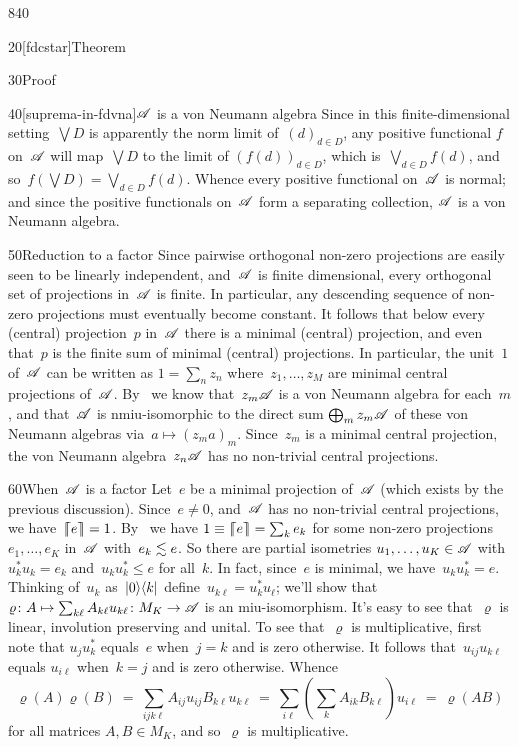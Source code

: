 \begin{parsec}{840}
\begin{point}{20}[fdcstar]{Theorem}
\begin{point}{30}{Proof}
\begin{point}{40}[suprema-in-fdvna]{$\mathscr{A}$ is a von Neumann algebra}
Since in this finite-dimensional setting~$\bigvee D$
is apparently the norm limit of~$(d)_{d\in D}$,
any positive functional $f$ on~$\mathscr{A}$
will map~$\bigvee D$ to the limit of
$(f(d))_{d\in D}$,
which is~$\bigvee_{d\in D} f(d)$,
and so~$f(\bigvee D)=\bigvee_{d\in D} f(d)$.
Whence every positive functional on~$\mathscr{A}$
is normal; and since the positive functionals on~$\mathscr{A}$
form a separating collection,
$\mathscr{A}$ is a von Neumann algebra.
\end{point}
\begin{point}{50}{Reduction to a factor}%
Since pairwise orthogonal non-zero projections
are easily seen to be linearly independent,
and~$\mathscr{A}$ is finite dimensional,
every orthogonal set of projections in~$\mathscr{A}$ is finite.
In particular,
any descending sequence of non-zero projections must eventually become
constant.
It follows that below every (central) projection~$p$ in~$\mathscr{A}$
there is a minimal (central) projection,
and even that~$p$ is the finite sum of minimal (central) projections.
In particular,
the unit~$1$ of~$\mathscr{A}$ can be written
as $1=\sum_n z_n$ where~$z_1,\dotsc,z_M$ are minimal central projections
of~$\mathscr{A}$.
By~
we know that~$z_m\mathscr{A}$ is a von Neumann algebra for each~$m$,
and that~$\mathscr{A}$ is nmiu-isomorphic
to the direct sum $\bigoplus_m z_m \mathscr{A}$
of these von Neumann algebras
via~$a\mapsto (z_ma)_m$.
Since~$z_m$ is a minimal central projection,
the von Neumann algebra~$z_n \mathscr{A}$
has no non-trivial central projections.
\end{point}
\begin{point}{60}{When~$\mathscr{A}$ is a factor}%
Let~$e$ be a minimal
projection of~$\mathscr{A}$
(which exists by the previous discussion).
Since~$e\neq 0$,
and~$\mathscr{A}$ has no non-trivial central projections,
we have~$\left\lceil\!\!\left\lceil e\right\rceil\!\!\right\rceil=1$.
By~
we have $1\equiv \left\lceil\!\!\left\lceil e\right\rceil\!\!\right\rceil=\sum_k e_k$
for some non-zero projections $e_1,\dotsc,e_K$
in~$\mathscr{A}$
with~$e_k\vmleq e$.
So there are partial isometries
$u_1,\dotsc,u_K\in\mathscr{A}$
with $u_k^* u_k = e_k$
and~$u_ku_k^*\leq e$ for all~$k$.
In fact,
since~$e$ is minimal,
we have~$u_ku_k^* = e$.
Thinking of~$u_k$
as~$\left|0\right>\!\left<k\right|$
define~$u_{k\ell } = u_k ^* u_\ell$;
we'll show that
$\varrho\colon A\mapsto \sum_{k\ell} A_{k\ell}  u_{ k \ell}
\colon M_K\to\mathscr{A}$
is an miu-isomorphism.
It's easy to see that~$\varrho$
is linear, involution preserving and unital.
To see that~$\varrho$ is multiplicative,
first note that $u_j u_k^*$ equals~$e$ when~$j=k$
and is zero otherwise.
It follows
that~$u_{ij} u_{k\ell}$
equals $u_{i\ell}$
when~$k=j$ and is zero otherwise.
Whence
\begin{equation*}
	\textstyle
\varrho(A)\varrho(B)
\ =\  
	\sum_{ijk\ell}
	A_{ij}u_{ij} B_{k\ell}u_{k\ell}
\ = \ 
	\sum_{i\ell} ( \sum_k A_{ik} B_{k\ell}) u_{i\ell}
	\ = \ \varrho( AB)
\end{equation*}
for all matrices $A,B\in M_K$,
and so~$\varrho$ is multiplicative.


\end{point}
\end{point}
\end{point}
\end{parsec}
